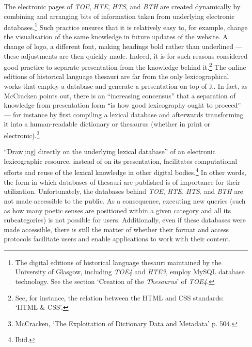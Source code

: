The electronic pages of \textit{TOE}, \textit{HTE}, \textit{HTS}, and \textit{BTH} are created dynamically by combining and arranging bits of information taken from underlying electronic databases.\footnote{The digital editions of historical language thesauri maintained by the University of Glasgow, including \textit{TOE4} and \textit{HTE3}, employ MySQL database technology. See the section `Creation of the \textit{Thesaurus}' of \textit{TOE4}.} Such practice ensures that it is relatively easy to, for example, change the visualisation of the same knowledge in future updates of the website. A change of logo, a different font, making headings bold rather than underlined --- these adjustments are then quickly made. Indeed, it is for such reasons considered good practice to separate presentation from the knowledge behind it.\footnote{See, for instance, the relation between the HTML and CSS standards: `HTML \& CSS'.} %
The online editions of historical language thesauri are far from the only lexicographical works that employ a database and generate a presentation on top of it. In fact, as McCracken points out, there is an ``increasing concensus'' that a separation of knowledge from presentation form ``is how good lexicography ought to proceed'' --- for instance by first compiling a lexical database and afterwards transforming it into a human-readable dictionary or thesaurus (whether in print or electronic).\footnote{McCracken, `The Exploitation of Dictionary Data and Metadata' p. 504.}

``Draw[ing] directly on the underlying lexical database'' of an electronic lexicographic resource, instead of on its presentation, facilitates computational efforts and reuse of the lexical knowledge in other digital bodies.\footnote{Ibid.} %
In other words, the form in which databases of thesauri are published is of importance for their utilization. Unfortunately, the databases behind \textit{TOE}, \textit{HTE}, \textit{HTS}, and \textit{BTH} are not made accessible to the public. As a consequence, executing new queries (such as how many poetic senses are positioned within a given category and all its subcategories) is not possible for users. Additionally, even if these databases were made accessible, there is still the matter of whether their format and access protocols facilitate users and enable applications to work with their content.


